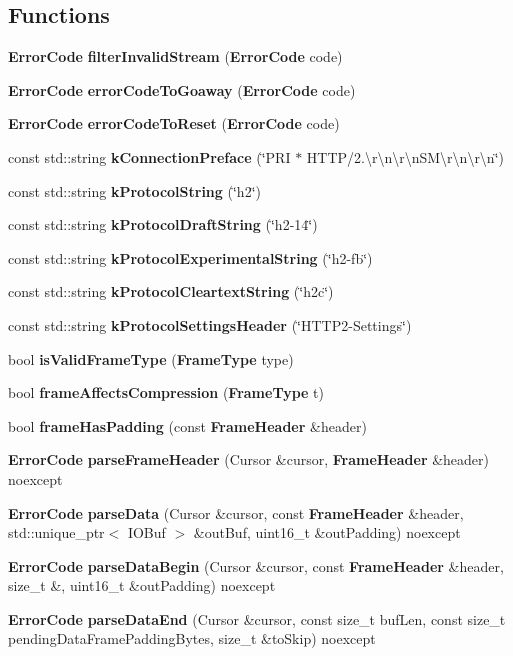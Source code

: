 \subsection*{Functions}
\begin{DoxyCompactItemize}
\item 
{\bf Error\+Code} {\bf filter\+Invalid\+Stream} ({\bf Error\+Code} code)
\item 
{\bf Error\+Code} {\bf error\+Code\+To\+Goaway} ({\bf Error\+Code} code)
\item 
{\bf Error\+Code} {\bf error\+Code\+To\+Reset} ({\bf Error\+Code} code)
\item 
const std\+::string {\bf k\+Connection\+Preface} (\char`\"{}P\+RI $\ast$ H\+T\+TP/2.\textbackslash{}r\textbackslash{}n\textbackslash{}r\textbackslash{}n\+S\+M\textbackslash{}r\textbackslash{}n\textbackslash{}r\textbackslash{}n\char`\"{})
\item 
const std\+::string {\bf k\+Protocol\+String} (\char`\"{}h2\char`\"{})
\item 
const std\+::string {\bf k\+Protocol\+Draft\+String} (\char`\"{}h2-\/14\char`\"{})
\item 
const std\+::string {\bf k\+Protocol\+Experimental\+String} (\char`\"{}h2-\/fb\char`\"{})
\item 
const std\+::string {\bf k\+Protocol\+Cleartext\+String} (\char`\"{}h2c\char`\"{})
\item 
const std\+::string {\bf k\+Protocol\+Settings\+Header} (\char`\"{}H\+T\+T\+P2-\/Settings\char`\"{})
\item 
bool {\bf is\+Valid\+Frame\+Type} ({\bf Frame\+Type} type)
\item 
bool {\bf frame\+Affects\+Compression} ({\bf Frame\+Type} t)
\item 
bool {\bf frame\+Has\+Padding} (const {\bf Frame\+Header} \&header)
\item 
{\bf Error\+Code} {\bf parse\+Frame\+Header} (Cursor \&cursor, {\bf Frame\+Header} \&header) noexcept
\item 
{\bf Error\+Code} {\bf parse\+Data} (Cursor \&cursor, const {\bf Frame\+Header} \&header, std\+::unique\+\_\+ptr$<$ I\+O\+Buf $>$ \&out\+Buf, uint16\+\_\+t \&out\+Padding) noexcept
\item 
{\bf Error\+Code} {\bf parse\+Data\+Begin} (Cursor \&cursor, const {\bf Frame\+Header} \&header, size\+\_\+t \&, uint16\+\_\+t \&out\+Padding) noexcept
\item 
{\bf Error\+Code} {\bf parse\+Data\+End} (Cursor \&cursor, const size\+\_\+t buf\+Len, const size\+\_\+t pending\+Data\+Frame\+Padding\+Bytes, size\+\_\+t \&to\+Skip) noexcept

\end{DoxyCompactItemize}
